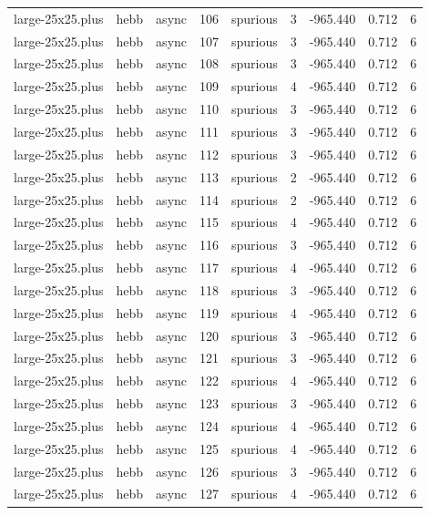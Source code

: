 \begin{tabular}{lllrlrrrr}
large-25x25.plus & hebb & async & 106 & spurious & 3 & -965.440 & 0.712 & 6 \\
large-25x25.plus & hebb & async & 107 & spurious & 3 & -965.440 & 0.712 & 6 \\
large-25x25.plus & hebb & async & 108 & spurious & 3 & -965.440 & 0.712 & 6 \\
large-25x25.plus & hebb & async & 109 & spurious & 4 & -965.440 & 0.712 & 6 \\
large-25x25.plus & hebb & async & 110 & spurious & 3 & -965.440 & 0.712 & 6 \\
large-25x25.plus & hebb & async & 111 & spurious & 3 & -965.440 & 0.712 & 6 \\
large-25x25.plus & hebb & async & 112 & spurious & 3 & -965.440 & 0.712 & 6 \\
large-25x25.plus & hebb & async & 113 & spurious & 2 & -965.440 & 0.712 & 6 \\
large-25x25.plus & hebb & async & 114 & spurious & 2 & -965.440 & 0.712 & 6 \\
large-25x25.plus & hebb & async & 115 & spurious & 4 & -965.440 & 0.712 & 6 \\
large-25x25.plus & hebb & async & 116 & spurious & 3 & -965.440 & 0.712 & 6 \\
large-25x25.plus & hebb & async & 117 & spurious & 4 & -965.440 & 0.712 & 6 \\
large-25x25.plus & hebb & async & 118 & spurious & 3 & -965.440 & 0.712 & 6 \\
large-25x25.plus & hebb & async & 119 & spurious & 4 & -965.440 & 0.712 & 6 \\
large-25x25.plus & hebb & async & 120 & spurious & 3 & -965.440 & 0.712 & 6 \\
large-25x25.plus & hebb & async & 121 & spurious & 3 & -965.440 & 0.712 & 6 \\
large-25x25.plus & hebb & async & 122 & spurious & 4 & -965.440 & 0.712 & 6 \\
large-25x25.plus & hebb & async & 123 & spurious & 3 & -965.440 & 0.712 & 6 \\
large-25x25.plus & hebb & async & 124 & spurious & 4 & -965.440 & 0.712 & 6 \\
large-25x25.plus & hebb & async & 125 & spurious & 4 & -965.440 & 0.712 & 6 \\
large-25x25.plus & hebb & async & 126 & spurious & 3 & -965.440 & 0.712 & 6 \\
large-25x25.plus & hebb & async & 127 & spurious & 4 & -965.440 & 0.712 & 6 \\

\end{tabular}
